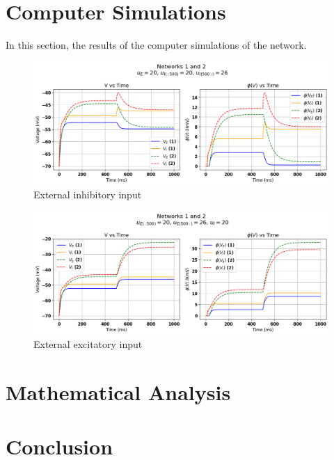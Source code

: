 \documentclass[10pt,twocolumn]{article}
\begin{document}
\section{Computer Simulations}
In this section, the results of the computer simulations of the network.

\begin{figure}
    \centering
    \includegraphics[width=1\textwidth]{images/12-I_input.png}
    \caption{External inhibitory input}
    \label{fig:i-input}
\end{figure}

\begin{figure}
    \centering
    \includegraphics[width=1\textwidth]{images/12-E_input.png}
    \caption{External excitatory input}
    \label{fig:e-input}
\end{figure}

\section{Mathematical Analysis}

\section{Conclusion}

\pagebreak
\printbibliography
\end{document}
